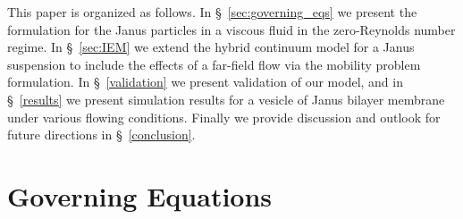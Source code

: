 \documentclass[lineno]{jfm}
\begin{document}
This paper is organized as follows. In \S~\ref{sec:governing_eqs} we present the formulation for the Janus particles in a viscous fluid in the zero-Reynolds number regime. In \S~\ref{sec:IEM} we extend the hybrid continuum model for a Janus suspension to include the effects of a far-field flow via the mobility problem formulation. In \S~\ref{validation} we present validation of our model, and in \S~\ref{results} we present simulation results for a vesicle of Janus bilayer membrane under various flowing conditions. Finally we provide discussion and outlook for future directions in \S~\ref{conclusion}.~


\section{Governing  Equations\label{sec:governing_eqs}}
\end{document}
